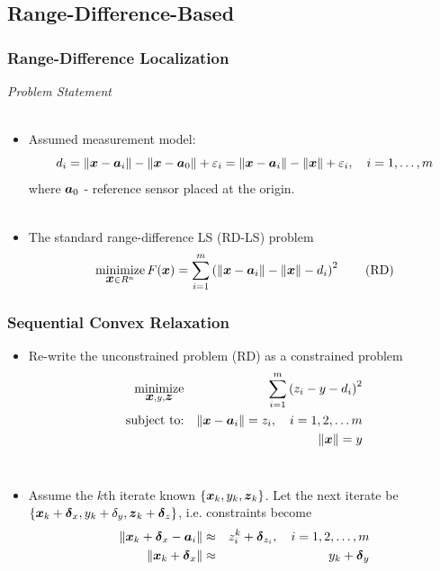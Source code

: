 \documentclass [t] {beamer} %
\begin{document}
\subsection{Range-Difference-Based}

\begin{frame} %
\frametitle{Range-Difference Localization} %
{\large \textit{Problem Statement}}
\\~\\
\normalsize
\begin{itemize}
\item 
Assumed measurement model:
 \begin{equation} 
 \nonumber
 d_i=\|\mbox{\boldmath$x$}-\mbox{\boldmath$a$}_i\|-\|\mbox{\boldmath$x$}-\mbox{\boldmath$a$}_0\| + \varepsilon_i=\|\mbox{\boldmath$x$}-\mbox{\boldmath$a$}_i\|-\|\mbox{\boldmath$x$}\|+ \varepsilon_i, \quad i = 1,\ldots,m
 \end{equation}
where $\mbox{\boldmath$a$}_0$ - reference sensor placed at the origin.\\~\\
 \item 
 The standard range-difference LS (RD-LS) problem 
 \begin{equation} \label{RD}
\mathop{\mbox{minimize}}_{\mbox{\boldmath$x$} \in R^n} F(\mbox{\boldmath$x$})=\sum_{i=1}^m \left(\|\mbox{\boldmath$x$}-\mbox{\boldmath$a$}_i\| - \|\mbox{\boldmath$x$}\| -d_i\right)^2 \tag{RD}
 \end{equation}
 \end{itemize}
\end{frame}


\begin{frame} %
\frametitle{Sequential Convex Relaxation}
\phantom{m}
\begin{itemize}
\item
Re-write the unconstrained problem (RD) as a constrained problem
\begin{eqnarray} 
\nonumber
\mathop{\mbox{minimize}}_{\mbox{\boldmath$x$}, y, \mbox{\boldmath$z$}} & & \sum^m_{i=1}\left( z_i - y - d_i\right)^2\\
\nonumber
\mbox{subject to:}& &\|\mbox{\boldmath$x$} - \mbox{\boldmath$a$}_i\| = z_i, \quad  i = 1, 2, \ldots m \\
\nonumber
& &\|\mbox{\boldmath$x$}\|  = y
\end{eqnarray}
\\
\item
Assume the $k$th iterate known $\lbrace\mbox{\boldmath$x$}_k, y_k, \mbox{\boldmath$z$}_k\rbrace$. Let the next iterate be $\lbrace\mbox{\boldmath$x$}_k +\mbox{\boldmath${\delta}$}_x, y_k + \delta_y, \mbox{\boldmath$z$}_k + \mbox{\boldmath${\delta}$}_z\rbrace$, i.e. constraints become
\begin{eqnarray}
\nonumber
\|\mbox{\boldmath$x$}_{k} + \mbox{\boldmath${\delta}$}_x - \mbox{\boldmath$a$}_i\| &\approx &z_i^{k} + \mbox{\boldmath${\delta}$}_{z_i}, \quad i = 1, 2, \ldots, m \\
\nonumber
\|\mbox{\boldmath$x$}_{k} + \mbox{\boldmath${\delta}$}_x\| &\approx &y_{k}  + \mbox{\boldmath${\delta}$}_y
\end{eqnarray}

\end{itemize}
\end{frame}
\end{document}
